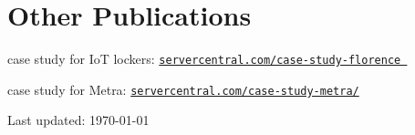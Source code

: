 \documentclass[11pt,letterpaper]{article}
\def\footerlink{}
\renewenvironment{itemize}{
  \begin{list}{}{
    \setlength{\leftmargin}{1.5em}
  }
}{
  \end{list}
}
\begin{document}
\section* {Other Publications}
\begin {itemize}
\item case study for IoT lockers: \href{https://www.servercentral.com/case-study-florence/}{\tt {servercentral.com/case-study-florence }}
\item case study for Metra: \href{https://www.servercentral.com/case-study-metra/}{\tt {servercentral.com/case-study-metra/}}
\end {itemize}



\begin{center}
  \begin{footnotesize}
    Last updated: \today \\
    \href{\footerlink}{\texttt{\footerlink}}
  \end{footnotesize}
\end{center}
\end{document}
